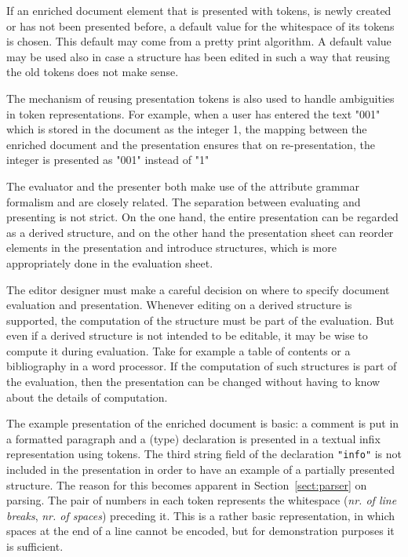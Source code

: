 If an enriched document element that is presented with tokens, is newly created or has not been presented before, a default value for the whitespace of its tokens is chosen. This default may come from a pretty print algorithm. A default value may be used also in case a structure has been edited in such a way that reusing the old tokens does not make sense.

The mechanism of reusing presentation tokens is also used to handle ambiguities in token representations. For example, when a user has entered the text "001" which is stored in the document as the integer 1, the mapping between the enriched document and the presentation ensures that on re-presentation, the integer is presented as "001" instead of "1"

The evaluator and the presenter both make use of the attribute grammar formalism and are closely related. The separation between evaluating and presenting is not strict. On the one hand, the entire presentation can be regarded as a derived structure, and on the other hand the presentation sheet can reorder elements in the presentation and introduce structures, which is more appropriately done in the evaluation sheet. 

The editor designer must make a careful decision on where to specify document evaluation and presentation. Whenever editing on a derived structure is supported, the computation of the structure must be part of the evaluation. But even if a derived structure is not intended to be editable, it may be wise to compute it during evaluation. Take for example a table of contents or a bibliography in a word processor. If the computation of such structures is part of the evaluation, then the presentation can be changed without having to know about the details of computation.

 The example presentation of the enriched document is basic: a comment is put in a formatted paragraph and a (type) declaration is presented in a textual infix representation using tokens. The third string field of the declaration \verb|"info"| is not included in the presentation in order to have an example of a partially presented structure. The reason for this becomes apparent in Section~\ref{sect:parser} on parsing. The pair of numbers in each token represents the whitespace ({\em nr. of line breaks}, {\em nr. of spaces}) preceding it. This is a rather basic representation, in which spaces at the end of a line cannot be encoded, but for demonstration purposes it is sufficient.

